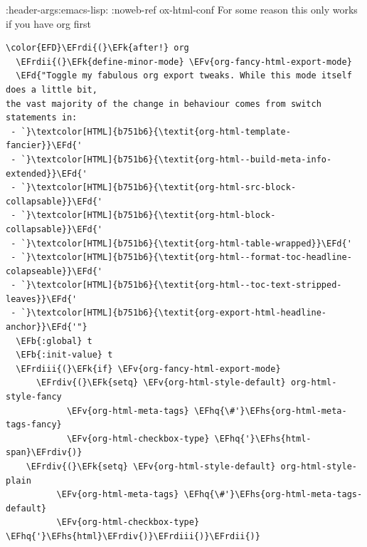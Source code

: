 \documentclass{scrartcl}
\newcommand{\EFk}[1]{\textcolor{EFk}{#1}} %
\newcommand{\EFd}[1]{\textcolor{EFd}{\textit{#1}}} %
\newcommand{\EFb}[1]{\textcolor{EFb}{#1}} %
\newcommand{\EFv}[1]{\textcolor{EFv}{#1}} %
\newcommand{\EFhq}[1]{\textcolor{EFhq}{#1}} %
\newcommand{\EFhs}[1]{\textcolor{EFhs}{#1}} %
\newcommand{\EFrdi}[1]{\textcolor{EFrdi}{#1}} %
\newcommand{\EFrdii}[1]{\textcolor{EFrdii}{#1}} %
\newcommand{\EFrdiii}[1]{\textcolor{EFrdiii}{#1}} %
\newcommand{\EFrdiv}[1]{\textcolor{EFrdiv}{#1}} %
\begin{document}
:header-args:emacs-lisp: :noweb-ref ox-html-conf
For some reason this only works if you have org first
\begin{Code}
\begin{Verbatim}[]
\color{EFD}\EFrdi{(}\EFk{after!} org
  \EFrdii{(}\EFk{define-minor-mode} \EFv{org-fancy-html-export-mode}
  \EFd{"Toggle my fabulous org export tweaks. While this mode itself does a little bit,
the vast majority of the change in behaviour comes from switch statements in:
 - `}\textcolor[HTML]{b751b6}{\textit{org-html-template-fancier}}\EFd{'
 - `}\textcolor[HTML]{b751b6}{\textit{org-html--build-meta-info-extended}}\EFd{'
 - `}\textcolor[HTML]{b751b6}{\textit{org-html-src-block-collapsable}}\EFd{'
 - `}\textcolor[HTML]{b751b6}{\textit{org-html-block-collapsable}}\EFd{'
 - `}\textcolor[HTML]{b751b6}{\textit{org-html-table-wrapped}}\EFd{'
 - `}\textcolor[HTML]{b751b6}{\textit{org-html--format-toc-headline-colapseable}}\EFd{'
 - `}\textcolor[HTML]{b751b6}{\textit{org-html--toc-text-stripped-leaves}}\EFd{'
 - `}\textcolor[HTML]{b751b6}{\textit{org-export-html-headline-anchor}}\EFd{'"}
  \EFb{:global} t
  \EFb{:init-value} t
  \EFrdiii{(}\EFk{if} \EFv{org-fancy-html-export-mode}
      \EFrdiv{(}\EFk{setq} \EFv{org-html-style-default} org-html-style-fancy
            \EFv{org-html-meta-tags} \EFhq{\#'}\EFhs{org-html-meta-tags-fancy}
            \EFv{org-html-checkbox-type} \EFhq{'}\EFhs{html-span}\EFrdiv{)}
    \EFrdiv{(}\EFk{setq} \EFv{org-html-style-default} org-html-style-plain
          \EFv{org-html-meta-tags} \EFhq{\#'}\EFhs{org-html-meta-tags-default}
          \EFv{org-html-checkbox-type} \EFhq{'}\EFhs{html}\EFrdiv{)}\EFrdiii{)}\EFrdii{)}


\end{Verbatim}
\end{Code}
\end{document}
